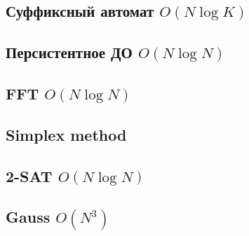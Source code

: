\documentclass[10pt]{article}
\begin{document}
\begin{multicols}{2}
\subsection{Суффиксный автомат $O(N\log{K})$}

\subsection{Персистентное ДО $O(N\log{N})$}

\subsection{FFT $O(N\log{N})$}

\subsection{Simplex method}

\subsection{2-SAT $O(N\log{N})$}

\subsection{Gauss $O(N^{3})$}

\end{multicols}
\newpage
\end{document}
